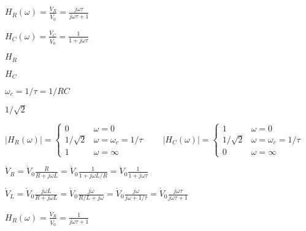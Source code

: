 \documentclass{article}
\def\lthtmlcheckvsize{\ifdim\ht\sizebox<\vsize 
  \ifdim\wd\sizebox<\hsize\expandafter\hfill\fi \expandafter\vfill
  \else\expandafter\vss\fi}%
\begin{document}
{\newpage\clearpage
{}%
$\displaystyle H_R(\omega)=\frac{\dot{V}_R}{\dot{V}_0}=\frac{j\omega\tau}{j\omega\tau+1}$%
\lthtmlindisplaymathZ
\lthtmlcheckvsize\clearpage}

{\newpage\clearpage
{}%
$\displaystyle H_C(\omega)=\frac{\dot{V}_C}{\dot{V}_0}=\frac{1}{1+j\omega\tau}$%
\lthtmlindisplaymathZ
\lthtmlcheckvsize\clearpage}

{\newpage\clearpage
{}%
$ H_R$%
\lthtmlindisplaymathZ
\lthtmlcheckvsize\clearpage}

{\newpage\clearpage
{}%
$ H_C$%
\lthtmlindisplaymathZ
\lthtmlcheckvsize\clearpage}

{\newpage\clearpage
{}%
$ \omega_c=1/\tau=1/RC$%
\lthtmlindisplaymathZ
\lthtmlcheckvsize\clearpage}

{\newpage\clearpage
{}%
$ 1/\sqrt{2}$%
\lthtmlindisplaymathZ
\lthtmlcheckvsize\clearpage}

{\newpage\clearpage
{}%
$\displaystyle |H_R(\omega)|=\left\{\begin{array}{cl}0&\omega=0\\
1/\sqrt{2}&\omega=\omega_c=1/\tau\\1&\omega=\infty\end{array}\right.
\;\;\;\;\;\;\;
|H_C(\omega)|=\left\{\begin{array}{cl}1&\omega=0\\
1/\sqrt{2}&\omega=\omega_c=1/\tau\\0&\omega=\infty\end{array}\right.$%
\lthtmlindisplaymathZ
\lthtmlcheckvsize\clearpage}

{\newpage\clearpage
{}%
$\displaystyle \dot{V}_R=\dot{V}_0\frac{R}{R+j\omega L}
=\dot{V}_0\frac{1}{1+j\omega L/R}=\dot{V}_0\frac{1}{1+j\omega\tau}$%
\lthtmlindisplaymathZ
\lthtmlcheckvsize\clearpage}

{\newpage\clearpage
{}%
$\displaystyle \dot{V}_L=\dot{V}_0\frac{j\omega L}{R+j\omega L}
=\dot{V}_0\frac{j\omega}{R/L+j\omega}=\dot{V}_0\frac{j\omega}{j\omega+1/\tau}
=\dot{V}_0\frac{j\omega\tau}{j\omega\tau+1}$%
\lthtmlindisplaymathZ
\lthtmlcheckvsize\clearpage}

{\newpage\clearpage
{}%
$\displaystyle H_R(\omega)=\frac{\dot{V}_R}{\dot{V}_0}=\frac{1}{j\omega\tau+1}$%
\lthtmlindisplaymathZ
\lthtmlcheckvsize\clearpage}
\end{document}
